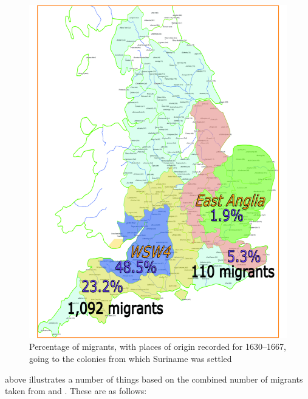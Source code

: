 \begin{figure}
\includegraphics[width=\textwidth, scale=.25] {figures/migrants.pdf}
\caption {Percentage of migrants, with places of origin recorded for 1630--1667, going to the colonies from which {Suriname} was settled} 
\label{Map6.1}
\end{figure}

 above illustrates a number of things based on the combined number of migrants taken from   and . These are as follows:

